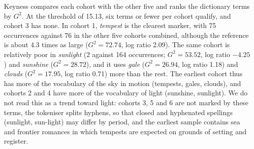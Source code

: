 \documentclass[11pt]{article}
\begin{document}
Keyness compares each cohort with the other five and ranks the dictionary terms by $G^2$. At the threshold of 15.13, six terms or fewer per cohort qualify, and cohort 3 has none.
In cohort 1, \emph{tempest} is the clearest marker, with 75 occurrences against 76 in the other five cohorts combined, although the reference is about 4.3 times as large ($G^2=72.74$, log ratio 2.09).
The same cohort is relatively poor in \emph{sunlight} (2 against 164 occurrences; $G^2=53.52$, log ratio $-4.25$) and \emph{sunshine} ($G^2=28.72$), and it uses \emph{gale} ($G^2=26.94$, log ratio 1.18) and \emph{clouds} ($G^2=17.95$, log ratio 0.71) more than the rest.
The earliest cohort thus has more of the vocabulary of the sky in motion (tempests, gales, clouds), and cohorts 2 and 4 have more of the vocabulary of light (sunshine, sunlight). We do not read this as a trend toward light: cohorts 3, 5 and 6 are not marked by these terms, the tokeniser splits hyphens, so that closed and hyphenated spellings (sunlight, sun-light) may differ by period, and the earliest sample contains sea and frontier romances in which tempests are expected on grounds of setting and register.
\end{document}
